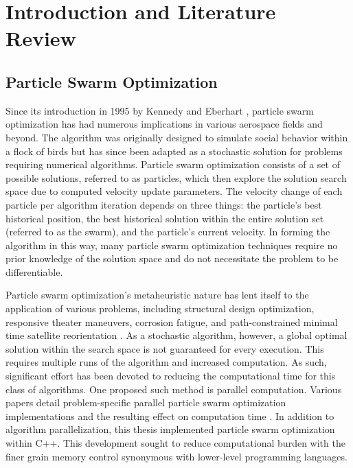 \chapter{Introduction and Literature Review}
\newpage


\section{Particle Swarm Optimization}

\noindent Since its introduction in 1995 by Kennedy and Eberhart \citep{Initial_PSO}, particle swarm optimization has had numerous implications in various aerospace fields and beyond.
The algorithm was originally designed to simulate social behavior within a flock of birds but has since been adapted as a stochastic solution for problems
requiring numerical algorithms. Particle swarm optimization consists of a set of possible solutions, referred to as particles, which then explore the solution search space due to
computed velocity update parameters. The velocity change of each particle per algorithm iteration depends on three things: the particle's best historical position, the best historical
solution within the entire solution set (referred to as the swarm), and the particle's current velocity. In forming the algorithm in this way, many particle swarm optimization techniques 
require no prior knowledge of the solution space and do not necessitate the problem to be differentiable. \newline

\noindent Particle swarm optimization's metaheuristic nature has lent itself to the application of various problems,
including structural design optimization, responsive theater maneuvers, corrosion fatigue, and path-constrained minimal time satellite reorientation
\citep{PSO1, PSO2, PSO3, PSO4}. As a stochastic algorithm, however, a global optimal solution within the search space is not guaranteed for every execution. 
This requires multiple runs of the algorithm and increased computation. As such, significant effort has been devoted to reducing the computational time for this class of
algorithms. One proposed such method is parallel computation. Various papers detail problem-specific parallel particle swarm optimization implementations and the resulting 
effect on computation time \citep{PPSO1, PPSO2, PPSO3}. In addition to algorithm parallelization, this thesis implemented particle swarm optimization within C++.
This development sought to reduce computational
burden with the finer grain memory control synonymous with lower-level programming languages. \newline

